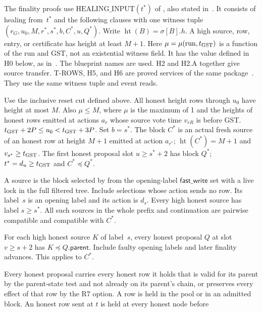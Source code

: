\documentclass{article}
\theoremstyle{plain}
\theoremstyle{definition}
\theoremstyle{remark}
\newcommand{\parent}{\mathsf{parent}}
\newcommand{\fname}[1]{\text{\textsc{#1}}}
\newcommand{\fastWrite}{\mathsf{fast\_write}}
\begin{document}
The finality proofs use $\mathrm{HEALING\_INPUT}(t^*)$ of
\cite[H.22]{BPH}, also stated in~\cite[\S1]{BPF}.
It consists of healing from~$t^*$ and the following clauses with one
witness tuple $(r_G,u_0,M,r^*,s^*,b,C^*,u,Q^*)$.
Write $\operatorname{ht}(B)=\sigma[B].h$.  A high source, row, entry,
or certificate has height at least $M+1$.
Here $\mu=\mu(\mathrm{run},t_{\rm GST})$ is a function of the run
and GST, not an existential witness field.  It has the value defined
in H0 below, as in~\cite[H.11]{BPH}.
The blueprint names are used.  H2 and H2.A together give source
transfer.  T-ROWS, H5, and H6 are proved services of the same package~\cite[H.22]{BPH}.  They use the same
witness tuple and event reads.
\begin{description}[leftmargin=1.5em]
\item[H0: cut and reset.]  Use the inclusive reset cut defined above.
  All honest height rows through $u_0$ have height at most $M$.
  Also $\mu\leq M$, where $\mu$ is the maximum of 1 and the heights
  of honest rows emitted at actions $a_r$ whose source vote time
  $v_{rR}$ is before GST.
  $t_{\rm GST}+2P\leq u_0<t_{\rm GST}+3P$.
  Set $b=s^*$.  The block $C^*$ is an actual fresh source of an honest
  row at height $M+1$ emitted at action $a_{r^*}$; $\operatorname{ht}(C^*)=M+1$
  and $v_{s^*}\geq t_{\rm GST}$.  The first honest proposal slot
  $u\geq s^*+2$ has block $Q^*$; $t^*=d_u\geq t_{\rm GST}$ and
  $C^*\preceq Q^*$.
\item[H1: actual sources.]  A source is the block selected by
  \fname{get\_fg\_vote} from the opening-label $\fastWrite$ set with
  a live lock in the full filtered tree.  Include selections whose
  action sends no row.  Its label~$s$ is an opening
  label and its action is $d_s$.  Every high honest source has label
  $s\geq s^*$.  All such sources in the whole prefix and continuation
  are pairwise compatible and compatible with $C^*$.
\item[H2: carrier-chain transfer (T-XFER).]  For each high honest
  source $K$ of label~$s$, every honest proposal $Q$ at slot
  $v\geq s+2$ has $K\preceq Q.\parent$.  Include faulty opening
  labels and later finality advances.  This applies to $C^*$.
\item[T-ROWS: honest-row service.]  Every honest proposal carries
  every honest row it holds that is valid for its parent by the
  parent-state test and not already on its parent's chain, or preserves
  every effect of that row by the R7 option.  A row is
  held in the pool or in an admitted block.
  An honest row sent at $t$ is held at every honest node before

\end{description}
\end{document}
